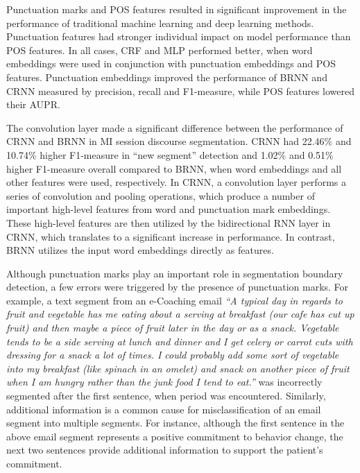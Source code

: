 \documentclass{amia}
\begin{document}
Punctuation marks and POS features resulted in significant improvement in the performance of traditional machine learning and deep learning methods. Punctuation features had stronger individual impact on model performance than POS features. In all cases, CRF and MLP performed better, when word embeddings were used in conjunction with punctuation embeddings and POS features. Punctuation embeddings improved the performance of BRNN and CRNN measured by precision, recall and F1-measure, while POS features lowered their AUPR. %

The convolution layer made a significant difference between the performance of CRNN and BRNN in MI session discourse segmentation. CRNN had 22.46\% and 10.74\% higher F1-measure in ``new segment'' detection and 1.02\% and 0.51\% higher F1-measure overall compared to BRNN, when word embeddings and all other features were used, respectively. In CRNN, a convolution layer performs a series of convolution and pooling operations, which produce a number of important high-level features from word and punctuation mark embeddings. These high-level features are then utilized by the bidirectional RNN layer in CRNN, which translates to a significant increase in performance. In contrast, BRNN utilizes the input word embeddings directly as features.     

Although punctuation marks play an important role in segmentation boundary detection, a few errors were triggered by the presence of punctuation marks. For example, a text segment from an e-Coaching email \textit{``A typical day in regards to fruit and vegetable has me eating about a serving at breakfast (our cafe has cut up fruit) and then maybe a piece of fruit later in the day or as a snack. Vegetable tends to be a side serving at lunch and dinner and I get celery or carrot cuts with dressing for a snack a lot of times. I could probably add some sort of vegetable into my breakfast (like spinach in an omelet) and snack on another piece of fruit when I am hungry rather than the junk food I tend to eat.''} was incorrectly segmented after the first sentence, when period was encountered. Similarly, additional information is a common cause for misclassification of an email segment into multiple segments. For instance, although the first sentence in the above email segment represents a positive commitment to behavior change, the next two sentences provide additional information to support the patient's commitment. 
\end{document}
